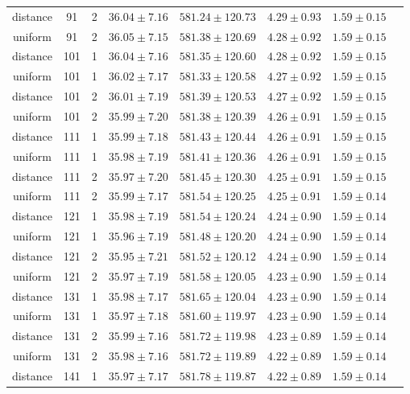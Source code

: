 \begin{tabular}{cccrrrrr}
distance & 91 & 2 & $36.04 \pm 7.16$ & $581.24 \pm 120.73$ & $4.29 \pm 0.93$ & $1.59 \pm 0.15$\\
uniform & 91 & 2 & $36.05 \pm 7.15$ & $581.38 \pm 120.69$ & $4.28 \pm 0.92$ & $1.59 \pm 0.15$\\
distance & 101 & 1 & $36.04 \pm 7.16$ & $581.35 \pm 120.60$ & $4.28 \pm 0.92$ & $1.59 \pm 0.15$\\
uniform & 101 & 1 & $36.02 \pm 7.17$ & $581.33 \pm 120.58$ & $4.27 \pm 0.92$ & $1.59 \pm 0.15$\\
distance & 101 & 2 & $36.01 \pm 7.19$ & $581.39 \pm 120.53$ & $4.27 \pm 0.92$ & $1.59 \pm 0.15$\\
uniform & 101 & 2 & $35.99 \pm 7.20$ & $581.38 \pm 120.39$ & $4.26 \pm 0.91$ & $1.59 \pm 0.15$\\
distance & 111 & 1 & $35.99 \pm 7.18$ & $581.43 \pm 120.44$ & $4.26 \pm 0.91$ & $1.59 \pm 0.15$\\
uniform & 111 & 1 & $35.98 \pm 7.19$ & $581.41 \pm 120.36$ & $4.26 \pm 0.91$ & $1.59 \pm 0.15$\\
distance & 111 & 2 & $35.97 \pm 7.20$ & $581.45 \pm 120.30$ & $4.25 \pm 0.91$ & $1.59 \pm 0.15$\\
uniform & 111 & 2 & $35.99 \pm 7.17$ & $581.54 \pm 120.25$ & $4.25 \pm 0.91$ & $1.59 \pm 0.14$\\
distance & 121 & 1 & $35.98 \pm 7.19$ & $581.54 \pm 120.24$ & $4.24 \pm 0.90$ & $1.59 \pm 0.14$\\
uniform & 121 & 1 & $35.96 \pm 7.19$ & $581.48 \pm 120.20$ & $4.24 \pm 0.90$ & $1.59 \pm 0.14$\\
distance & 121 & 2 & $35.95 \pm 7.21$ & $581.52 \pm 120.12$ & $4.24 \pm 0.90$ & $1.59 \pm 0.14$\\
uniform & 121 & 2 & $35.97 \pm 7.19$ & $581.58 \pm 120.05$ & $4.23 \pm 0.90$ & $1.59 \pm 0.14$\\
distance & 131 & 1 & $35.98 \pm 7.17$ & $581.65 \pm 120.04$ & $4.23 \pm 0.90$ & $1.59 \pm 0.14$\\
uniform & 131 & 1 & $35.97 \pm 7.18$ & $581.60 \pm 119.97$ & $4.23 \pm 0.90$ & $1.59 \pm 0.14$\\
distance & 131 & 2 & $35.99 \pm 7.16$ & $581.72 \pm 119.98$ & $4.23 \pm 0.89$ & $1.59 \pm 0.14$\\
uniform & 131 & 2 & $35.98 \pm 7.16$ & $581.72 \pm 119.89$ & $4.22 \pm 0.89$ & $1.59 \pm 0.14$\\
distance & 141 & 1 & $35.97 \pm 7.17$ & $581.78 \pm 119.87$ & $4.22 \pm 0.89$ & $1.59 \pm 0.14$\\

\end{tabular}
